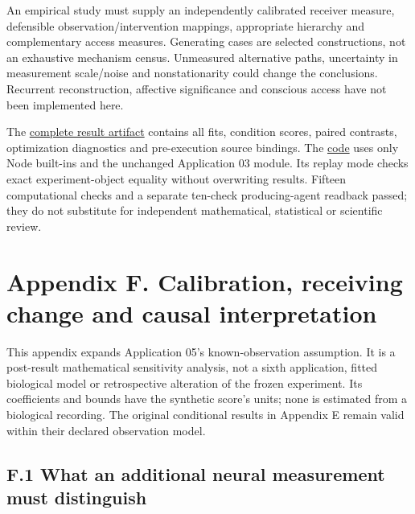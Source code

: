 \documentclass[
  american,
  11pt,
  letterpaper,
]{article}
\newcounter{none} %
\begin{document}
An empirical study must supply an independently calibrated receiver measure, defensible observation/intervention mappings, appropriate hierarchy and complementary access measures. Generating cases are selected constructions, not an exhaustive mechanism census. Unmeasured alternative paths, uncertainty in measurement scale/noise and nonstationarity could change the conclusions. Recurrent reconstruction, affective significance and conscious access have not been implemented here.

The \href{https://github.com/v5ma/v5ma.github.io/blob/master/papers/companions/learning-to-feel-v1.0/analysis/joint-receiver-comparison-results.json}{complete result artifact} contains all fits, condition scores, paired contrasts, optimization diagnostics and pre-execution source bindings. The \href{https://github.com/v5ma/v5ma.github.io/blob/master/papers/companions/learning-to-feel-v1.0/analysis/joint-receiver-comparison.mjs}{code} uses only Node built-ins and the unchanged Application 03 module. Its replay mode checks exact experiment-object equality without overwriting results. Fifteen computational checks and a separate ten-check producing-agent readback passed; they do not substitute for independent mathematical, statistical or scientific review.

\clearpage
\endgroup
\begingroup\setlength{\parskip}{2pt plus 1pt minus 1pt}
\hypertarget{appendix-f}{}

\section{Appendix F. Calibration, receiving change and causal interpretation}\label{appendix-f.-calibration-receiving-change-and-causal-interpretation}

This appendix expands Application 05's known-observation assumption. It is a post-result mathematical sensitivity analysis, not a sixth application, fitted biological model or retrospective alteration of the frozen experiment. Its coefficients and bounds have the synthetic score's units; none is estimated from a biological recording. The original conditional results in Appendix E remain valid within their declared observation model.

\subsection{F.1 What an additional neural measurement must distinguish}\label{f.1-what-an-additional-neural-measurement-must-distinguish}
\end{document}
